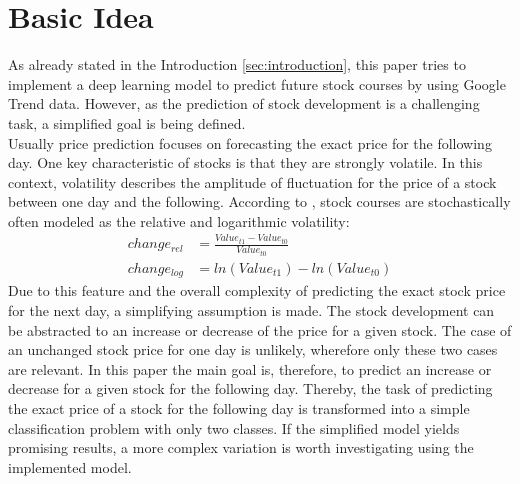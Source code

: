 \section{Basic Idea}
\label{sec:idea}
As already stated in the Introduction \ref{sec:introduction}, this paper tries to implement a deep learning model to predict future stock courses by using Google Trend data. However, as the prediction of stock development is a challenging task, a simplified goal is being defined. 
\\
Usually price prediction focuses on forecasting the exact price for the following day. One key characteristic of stocks is that they are strongly volatile. In this context, volatility describes the amplitude of fluctuation for the price of a stock between one day and the following. According to \cite{volatility}, stock courses are stochastically often modeled as the relative and logarithmic volatility: 
\begin{align}
change_{rel} &= \frac{Value_{t1} - Value_{t0}}{Value_{t0}} \\ 
change_{log} &= ln(Value_{t1}) - ln(Value_{t0})
\end{align}
Due to this feature and the overall complexity of predicting the exact stock price for the next day, a simplifying assumption is made. The stock development can be abstracted to an increase or decrease of the price for a given stock. The case of an unchanged stock price for one day is unlikely, wherefore only these two cases are relevant. In this paper the main goal is, therefore, to predict an increase or decrease for a given stock for the following day. Thereby, the task of predicting the exact price of a stock for the following day is transformed into a simple classification problem with only two classes. If the simplified model yields promising results, a more complex variation is worth investigating using the implemented model. 
